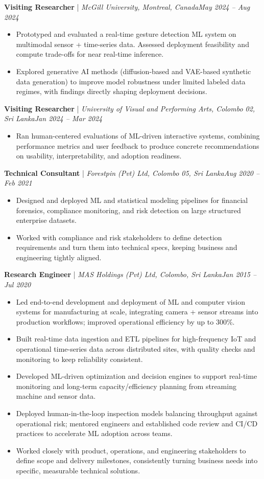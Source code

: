 \documentclass[11pt]{article}
\newenvironment{cvrole}[5]{%
  \par\noindent\textbf{\large #1} | \textit{\small #2, #3}\hfill \textit{\small #4 -- #5}\par
  \begin{itemize}[leftmargin=2em, itemsep=-0.3em, topsep=-0.5em]%
}{%
  \end{itemize}\par\noindent\mbox{}\par\vspace{0.1em}%
}
\begin{document}
\begin{cvrole}{Visiting Researcher}{McGill University}{Montreal, Canada}{May 2024}{Aug 2024}
    \item Prototyped and evaluated a real-time gesture detection ML system on multimodal sensor + time-series data. Assessed deployment feasibility and compute trade-offs for near real-time inference.
    \item Explored generative AI methods (diffusion-based and VAE-based synthetic data generation) to improve model robustness under limited labeled data regimes, with findings directly shaping deployment decisions.
\end{cvrole}

\begin{cvrole}{Visiting Researcher}{University of Visual and Performing Arts}{Colombo 02, Sri Lanka}{Jan 2024}{Mar 2024}
    \item Ran human-centered evaluations of ML-driven interactive systems, combining performance metrics and user feedback to produce concrete recommendations on usability, interpretability, and adoption readiness.
\end{cvrole}

\begin{cvrole}{Technical Consultant}{Forestpin (Pvt) Ltd}{Colombo 05, Sri Lanka}{Aug 2020}{Feb 2021}
    \item Designed and deployed ML and statistical modeling pipelines for financial forensics, compliance monitoring, and risk detection on large structured enterprise datasets.
    \item Worked with compliance and risk stakeholders to define detection requirements and turn them into technical specs, keeping business and engineering tightly aligned.
\end{cvrole}

\begin{cvrole}{Research Engineer}{MAS Holdings (Pvt) Ltd}{Colombo, Sri Lanka}{Jan 2015}{Jul 2020}
    \item Led end-to-end development and deployment of ML and computer vision systems for manufacturing at scale, integrating camera + sensor streams into production workflows; improved operational efficiency by up to 300\%.
    \item Built real-time data ingestion and ETL pipelines for high-frequency IoT and operational time-series data across distributed sites, with quality checks and monitoring to keep reliability consistent.
    \item Developed ML-driven optimization and decision engines to support real-time monitoring and long-term capacity/efficiency planning from streaming machine and sensor data.
    \item Deployed human-in-the-loop inspection models balancing throughput against operational risk; mentored engineers and established code review and CI/CD practices to accelerate ML adoption across teams.
    \item Worked closely with product, operations, and engineering stakeholders to define scope and delivery milestones, consistently turning business needs into specific, measurable technical solutions.
\end{cvrole}
\end{document}
